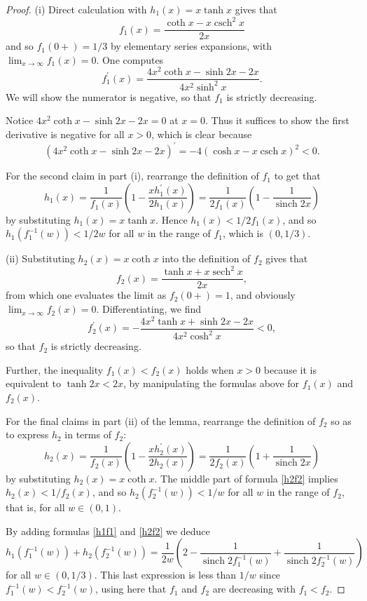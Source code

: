 \documentclass[12pt,reqno]{amsart}
\theoremstyle{definition}
\newcommand{\sech}{\operatorname{sech}}
\newcommand{\csch}{\operatorname{csch}}
\newcommand{\sinch}{\operatorname{sinch}}
\begin{document}
%
\begin{proof}
(i) Direct calculation with $h_1(x)=x \tanh x$ gives that 
\[
f_1(x) = \frac{\coth x - x \csch^2 x}{2x} 
\]
and so $f_1(0+)=1/3$ by elementary series expansions, with $\lim_{x \to \infty} f_1(x)=0$. One computes 
\[
f_1^\prime(x) = \frac{4x^2 \coth x - \sinh 2x - 2x}{4x^2 \sinh^2 x} .
\]
We will show the numerator is negative, so that $f_1$ is strictly decreasing. 

Notice $4x^2 \coth x - \sinh 2x - 2x = 0$ at $x=0$. Thus it suffices to show the first derivative is negative for all $x>0$, which is clear because
\[
(4x^2 \coth x - \sinh 2x - 2x)^\prime
= -4 (\cosh x - x \csch x)^2 <  0 .
\]

For the second claim in part (i), rearrange the definition of $f_1$ to get that 
%
\begin{equation} \label{h1f1}
h_1(x) = \frac{1}{f_1(x)} \left( 1 - \frac{x h_1^\prime(x)}{2h_1(x)} \right) = \frac{1}{2f_1(x)} \left( 1 - \frac{1}{\sinch 2x} \right) 
\end{equation}
%
by substituting $h_1(x)=x \tanh x$. Hence $h_1(x) < 1/2f_1(x)$, and so $h_1(f_1^{-1}(w)) < 1/2w$ for all $w$ in the range of $f_1$, which is $(0,1/3)$. 

(ii) Substituting $h_2(x)=x \coth x$ into the definition of $f_2$ gives that 
\[
f_2(x) = \frac{\tanh x + x \sech^2 x}{2x} ,
\]
from which one evaluates the limit as $f_2(0+)=1$, and obviously $\lim_{x \to \infty} f_2(x)=0$. Differentiating, we find
\[
f_2^\prime(x) = - \frac{4x^2 \tanh x + \sinh 2x - 2x}{4x^2 \cosh^2 x} < 0 ,
\]
so that $f_2$ is strictly decreasing. 

Further, the inequality $f_1(x)<f_2(x)$ holds when $x>0$ because it is equivalent to $\tanh 2x < 2x$, by manipulating the formulas above for $f_1(x)$ and $f_2(x)$. 

For the final claims in part (ii) of the lemma, rearrange the definition of $f_2$ so as to express $h_2$ in terms of $f_2$:
%
\begin{equation} \label{h2f2}
h_2(x) = \frac{1}{f_2(x)} \left( 1 - \frac{x h_2^\prime(x)}{2h_2(x)} \right) = \frac{1}{2f_2(x)} \left( 1 + \frac{1}{\sinch 2x} \right) 
\end{equation}
%
by substituting $h_2(x)=x \coth x$. The middle part of formula \eqref{h2f2} implies $h_2(x) < 1/f_2(x)$, and so $h_2(f_2^{-1}(w)) < 1/w$ for all $w$ in the range of $f_2$, that is, for all $w \in (0,1)$. 

By adding formulas \eqref{h1f1} and \eqref{h2f2} we deduce
\[
h_1(f_1^{-1}(w))+h_2(f_2^{-1}(w)) = \frac{1}{2w} \left( 2 - \frac{1}{\sinch 2f_1^{-1}(w)} + \frac{1}{\sinch 2f_2^{-1}(w)} \right) 
\]
for all $w \in (0,1/3)$. This last expression is less than $1/w$ since $f_1^{-1}(w) < f_2^{-1}(w)$, using here that $f_1$ and $f_2$ are decreasing with $f_1<f_2$. 
\end{proof}
\end{document}
